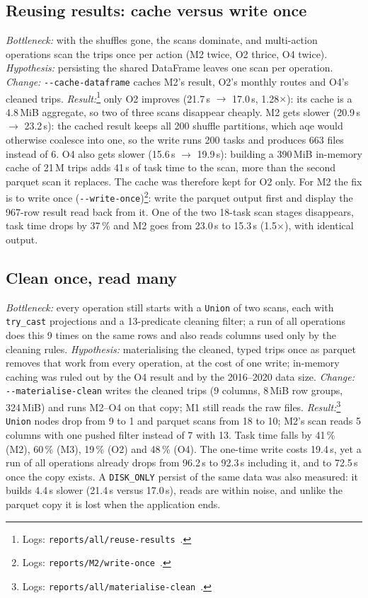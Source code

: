 \documentclass[sigconf]{acmart}
\newcommand{\src}[1]{\footnote{Logs: \texttt{reports/#1}~\cite{repo}.}}
\begin{document}
\subsection{Reusing results: cache versus write once}
\emph{Bottleneck:} with the shuffles gone, the scans dominate, and multi-action
operations scan the trips once per action (M2 twice, O2 thrice, O4 twice).
\emph{Hypothesis:} persisting the shared DataFrame leaves one scan per
operation. \emph{Change:} \texttt{-{}-cache-dataframe} caches M2's result, O2's
monthly routes and O4's cleaned trips. \emph{Result:}\src{all/reuse-results} only O2 improves (21.7\,s
$\to$ 17.0\,s, 1.28$\times$): its cache is a 4.8\,MiB aggregate, so two of
three scans disappear cheaply. M2 gets slower (20.9\,s $\to$ 23.2\,s): the
cached result keeps all 200 shuffle partitions, which \gls{aqe} would
otherwise coalesce into one, so the write runs 200 tasks and produces 663 files
instead of 6. O4 also gets slower (15.6\,s $\to$ 19.9\,s): building a 390\,MiB
in-memory cache of 21\,M trips adds 41\,s of task time to the scan, more than the
second parquet scan it replaces. The cache was therefore kept for O2 only. For
M2 the fix is to write once (\texttt{-{}-write-once})\src{M2/write-once}: write the
parquet output first and display the 967-row result read back from it. One of the
two 18-task scan stages disappears, task time drops by 37\,\% and M2 goes from
23.0\,s to 15.3\,s (1.5$\times$), with identical output.

\subsection{Clean once, read many}
\emph{Bottleneck:} every operation still starts with a \texttt{Union} of two
scans, each with \texttt{try\_cast} projections and a 13-predicate cleaning
filter; a run of all operations does this 9 times on the same rows and also reads
columns used only by the cleaning rules. \emph{Hypothesis:} materialising the cleaned,
typed trips once as parquet removes that work from every operation, at the cost
of one write; in-memory caching was ruled out by the O4 result and by the 2016--2020
data size. \emph{Change:} \texttt{-{}-materialise-clean} writes the cleaned
trips (9 columns, 8\,MiB row groups, 324\,MiB) and runs M2--O4 on that copy;
M1 still reads the raw files. \emph{Result:}\src{all/materialise-clean} \texttt{Union} nodes drop from 9 to
1 and parquet scans from 18 to 10; M2's scan reads 5 columns with one pushed
filter instead of 7 with 13. Task time falls by 41\,\% (M2), 60\,\% (M3), 19\,\%
(O2) and 48\,\% (O4). The one-time write costs 19.4\,s, yet a run of all
operations already drops from 96.2\,s to 92.3\,s including it, and to 72.5\,s once
the copy exists. A \texttt{DISK\_ONLY} persist of the same data was also
measured: it builds 4.4\,s slower (21.4\,s versus 17.0\,s), reads are within
noise, and unlike the parquet copy it is lost when the application ends.
\end{document}
